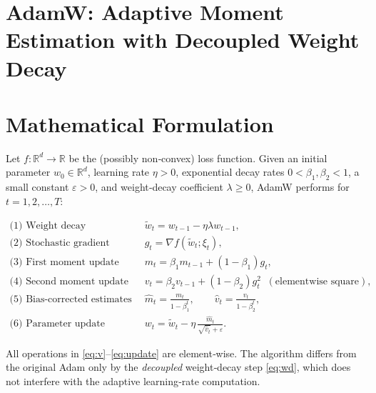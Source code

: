 \documentclass{article}
\newcommand{\R}{\mathbb{R}}
\begin{document}
\section*{AdamW: Adaptive Moment Estimation with Decoupled Weight Decay}

\section*{Mathematical Formulation}
Let $f:\R^{d}\rightarrow\R$ be the (possibly non‑convex) loss function.  
Given an initial parameter $w_{0}\in\R^{d}$, learning rate $\eta>0$, 
exponential decay rates $0<\beta_{1},\beta_{2}<1$, 
a small constant $\varepsilon>0$, and weight‑decay coefficient $\lambda\ge 0$, 
AdamW performs for $t=1,2,\dots,T$:

\begin{align}
\text{(1) Weight decay (decoupled)}\qquad &
\tilde w_{t}= w_{t-1}-\eta \lambda w_{t-1}, \label{eq:wd}\\[4pt]
\text{(2) Stochastic gradient} \qquad &
g_{t}= \nabla f(\tilde w_{t};\xi_{t}), \label{eq:grad}\\[4pt]
\text{(3) First moment update} \qquad &
m_{t}= \beta_{1} m_{t-1} + (1-\beta_{1}) g_{t}, \label{eq:m}\\[4pt]
\text{(4) Second moment update} \qquad &
v_{t}= \beta_{2} v_{t-1} + (1-\beta_{2}) g_{t}^{2}\;\;(\text{elementwise square}), \label{eq:v}\\[4pt]
\text{(5) Bias‑corrected estimates} \qquad &
\hat m_{t}= \frac{m_{t}}{1-\beta_{1}^{t}},\qquad
\hat v_{t}= \frac{v_{t}}{1-\beta_{2}^{t}}, \label{eq:bias}\\[4pt]
\text{(6) Parameter update} \qquad &
w_{t}= \tilde w_{t} - \eta \, \frac{\hat m_{t}}{\sqrt{\hat v_{t}}+\varepsilon}. \label{eq:update}
\end{align}

All operations in \eqref{eq:v}–\eqref{eq:update} are element‑wise.  
The algorithm differs from the original Adam only by the \emph{decoupled}
weight‑decay step \eqref{eq:wd}, which does not interfere with the adaptive
learning‑rate computation.
\end{document}
